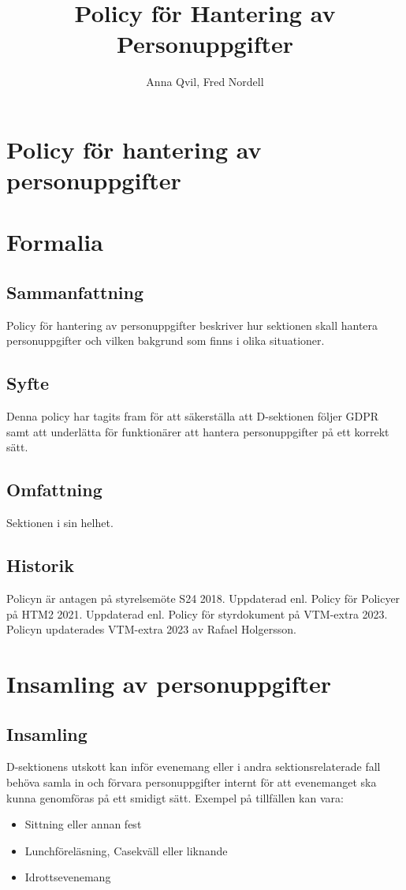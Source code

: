 \documentclass{dsekprotokoll}
\title{Policy för Hantering av Personuppgifter}
\author{Anna Qvil, Fred Nordell}
\begin{document}
\section*{Policy för hantering av personuppgifter}
\section{Formalia}
\subsection{Sammanfattning}
Policy för hantering av personuppgifter beskriver hur sektionen skall hantera personuppgifter och vilken bakgrund som finns i olika situationer.
\subsection{Syfte}

Denna policy har tagits fram för att säkerställa att D-sektionen följer GDPR samt att underlätta för funktionärer att hantera personuppgifter på ett korrekt sätt.
\subsection{Omfattning}
Sektionen i sin helhet.
\subsection{Historik}
Policyn är antagen på styrelsemöte S24 2018.
Uppdaterad enl. Policy för Policyer på HTM2 2021. Uppdaterad enl. Policy för styrdokument på VTM-extra 2023. Policyn updaterades VTM-extra 2023 av Rafael Holgersson.

\section{Insamling av personuppgifter}

\subsection{Insamling}
D-sektionens utskott kan inför evenemang eller i andra sektionsrelaterade fall behöva samla in och förvara personuppgifter internt för att evenemanget ska kunna genomföras på ett smidigt sätt. Exempel på tillfällen kan vara:
\begin{itemize}
    \item Sittning eller annan fest
    \item Lunchföreläsning, Casekväll eller liknande
    \item Idrottsevenemang
\end{itemize}
\end{document}
